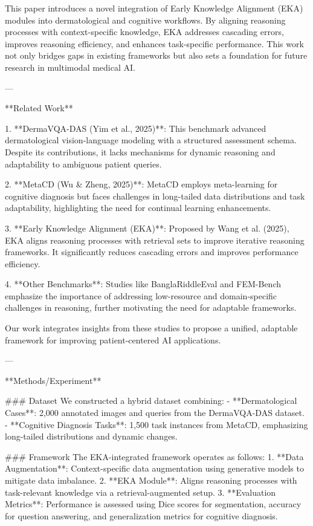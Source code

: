 This paper introduces a novel integration of Early Knowledge Alignment (EKA) modules into dermatological and cognitive workflows. By aligning reasoning processes with context-specific knowledge, EKA addresses cascading errors, improves reasoning efficiency, and enhances task-specific performance. This work not only bridges gaps in existing frameworks but also sets a foundation for future research in multimodal medical AI.

---

**Related Work**

1. **DermaVQA-DAS (Yim et al., 2025)**: This benchmark advanced dermatological vision-language modeling with a structured assessment schema. Despite its contributions, it lacks mechanisms for dynamic reasoning and adaptability to ambiguous patient queries.  

2. **MetaCD (Wu & Zheng, 2025)**: MetaCD employs meta-learning for cognitive diagnosis but faces challenges in long-tailed data distributions and task adaptability, highlighting the need for continual learning enhancements.

3. **Early Knowledge Alignment (EKA)**: Proposed by Wang et al. (2025), EKA aligns reasoning processes with retrieval sets to improve iterative reasoning frameworks. It significantly reduces cascading errors and improves performance efficiency.

4. **Other Benchmarks**: Studies like BanglaRiddleEval and FEM-Bench emphasize the importance of addressing low-resource and domain-specific challenges in reasoning, further motivating the need for adaptable frameworks.

Our work integrates insights from these studies to propose a unified, adaptable framework for improving patient-centered AI applications.

---

**Methods/Experiment**

### Dataset
We constructed a hybrid dataset combining:
- **Dermatological Cases**: 2,000 annotated images and queries from the DermaVQA-DAS dataset.
- **Cognitive Diagnosis Tasks**: 1,500 task instances from MetaCD, emphasizing long-tailed distributions and dynamic changes.

### Framework
The EKA-integrated framework operates as follows:
1. **Data Augmentation**: Context-specific data augmentation using generative models to mitigate data imbalance.
2. **EKA Module**: Aligns reasoning processes with task-relevant knowledge via a retrieval-augmented setup.
3. **Evaluation Metrics**: Performance is assessed using Dice scores for segmentation, accuracy for question answering, and generalization metrics for cognitive diagnosis.

